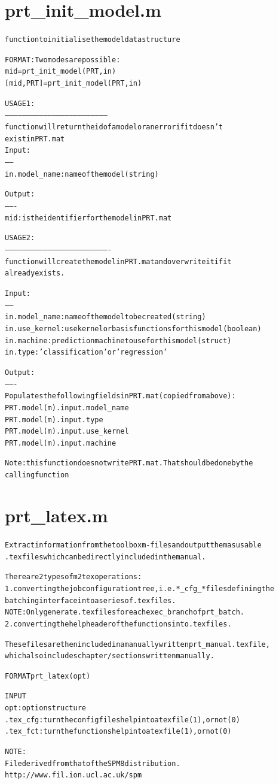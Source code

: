 \section{prt\_init\_model.m}
\begin{alltt}

 function to initialise the model data structure
 
 FORMAT: Two modes are possible:
     mid = prt\_init\_model(PRT, in)
     [mid, PRT] = prt\_init\_model(PRT, in)
 
 USAGE 1:
 ------------------------------------------------------------------------
 function will return the id of a model or an error if it doesn't
 exist in PRT.mat
 Input:
 ------
 in.model\_name: name of the model (string)
 
 Output:
 -------
 mid : is the identifier for the model in PRT.mat
 
 USAGE 2:
 -------------------------------------------------------------------------
 function will create the model in PRT.mat and overwrite it if it
 already exists.
 
 Input:
 ------
 in.model\_name: name of the model to be created (string)
 in.use\_kernel: use kernel or basis functions for this model (boolean)
 in.machine:    prediction machine to use for this model (struct)
 in.type:       'classification' or 'regression'
 
 Output:
 -------
 Populates the following fields in PRT.mat (copied from above):
 PRT.model(m).input.model\_name
 PRT.model(m).input.type
 PRT.model(m).input.use\_kernel
 PRT.model(m).input.machine
 
 Note: this function does not write PRT.mat. That should be done by the
       calling function
\end{alltt}


\section{prt\_latex.m}
\begin{alltt}

 Extract information from the toolbox m-files and output them as usable
 .tex files which can be directly included in the manual.
 
 There are 2 types of m2tex operations:
 1. converting the job configuration tree, i.e. *\_cfg\_* files defining the
    batching interface into a series of .tex files.
    NOTE: Only generate .tex files for each exec\_branch of prt\_batch.
 2. converting the help header of the functions into .tex files.
 
 These files are then included in a manually written prt\_manual.tex file,
 which also includes chapter/sections written manually.
 
 FORMAT prt\_latex(opt)
 
 INPUT
   opt:  option structure
     .tex\_cfg : turn the config files help into a tex file (1), or not (0)
     .tex\_fct : turn the functions help into a tex file (1), or not (0)
 
 NOTE:
 File derived from that of the SPM8 distribution.
   http://www.fil.ion.ucl.ac.uk/spm
\end{alltt}


